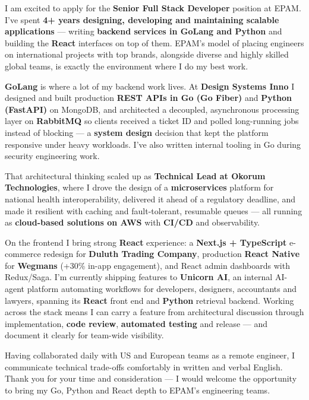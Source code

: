 \documentclass[11pt,a4paper]{awesome-cv}
\begin{document}
\makecvheader[R]
\makelettertitle

\begin{cvletter}

I am excited to apply for the \textbf{Senior Full Stack Developer} position at EPAM. I've spent \textbf{4+ years designing, developing and maintaining scalable applications} — writing \textbf{backend services in GoLang and Python} and building the \textbf{React} interfaces on top of them. EPAM's model of placing engineers on international projects with top brands, alongside diverse and highly skilled global teams, is exactly the environment where I do my best work.

\textbf{GoLang} is where a lot of my backend work lives. At \textbf{Design Systems Inno} I designed and built production \textbf{REST APIs in Go (Go Fiber)} and \textbf{Python (FastAPI)} on MongoDB, and architected a decoupled, asynchronous processing layer on \textbf{RabbitMQ} so clients received a ticket ID and polled long-running jobs instead of blocking — a \textbf{system design} decision that kept the platform responsive under heavy workloads. I've also written internal tooling in Go during security engineering work.

That architectural thinking scaled up as \textbf{Technical Lead at Okorum Technologies}, where I drove the design of a \textbf{microservices} platform for national health interoperability, delivered it ahead of a regulatory deadline, and made it resilient with caching and fault-tolerant, resumable queues — all running as \textbf{cloud-based solutions on AWS} with \textbf{CI/CD} and observability.

On the frontend I bring strong \textbf{React} experience: a \textbf{Next.js + TypeScript} e-commerce redesign for \textbf{Duluth Trading Company}, production \textbf{React Native} for \textbf{Wegmans} (+30\% in-app engagement), and React admin dashboards with Redux/Saga. I'm currently shipping features to \textbf{Unicorn AI}, an internal AI-agent platform automating workflows for developers, designers, accountants and lawyers, spanning its \textbf{React} front end and \textbf{Python} retrieval backend. Working across the stack means I can carry a feature from architectural discussion through implementation, \textbf{code review}, \textbf{automated testing} and release — and document it clearly for team-wide visibility.

Having collaborated daily with US and European teams as a remote engineer, I communicate technical trade-offs comfortably in written and verbal English. Thank you for your time and consideration — I would welcome the opportunity to bring my Go, Python and React depth to EPAM's engineering teams.

\end{cvletter}

\makeletterclosing
\end{document}
